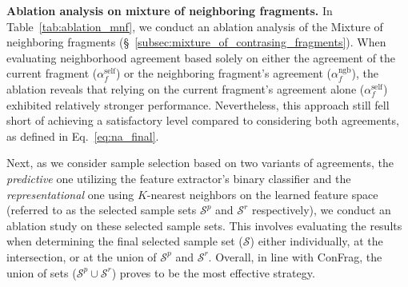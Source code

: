 \documentclass{article}
\theoremstyle{plain}
\theoremstyle{definition}
\theoremstyle{remark}
\begin{document}

\textbf{Ablation analysis on mixture of neighboring fragments.}
In Table~\ref{tab:ablation_mnf}, we conduct an ablation analysis of the Mixture of neighboring fragments (\S~\ref{subsec:mixture_of_contrasing_fragments}).
When evaluating neighborhood agreement based solely on either the agreement of the current fragment ($\alpha_f^\text{self}$) or the neighboring fragment's agreement ($\alpha_f^\text{ngb}$),
the ablation reveals that relying on the current fragment's agreement alone ($\alpha_f^\text{self}$) exhibited relatively stronger performance.
Nevertheless, this approach still fell short of achieving a satisfactory level compared to considering both agreements, as defined in Eq.~\ref{eq:na_final}.

Next, as we consider sample selection based on two variants of agreements, the \textit{predictive} one utilizing the feature extractor's binary classifier and the \textit{representational} one using $K$-nearest neighbors on the learned feature space
(referred to as the selected sample sets $\mathcal{S}^p$ and $\mathcal{S}^r$ respectively), we conduct an ablation study on these selected sample sets.
This involves evaluating the results when determining the final selected sample set ($\mathcal{S}$) either individually, at the intersection, or at the union of $\mathcal{S}^p$ and $\mathcal{S}^r$.
Overall, in line with ConFrag, the union of sets ($\mathcal{S}^p \cup \mathcal{S}^r$) proves to be the most effective strategy.
\end{document}
